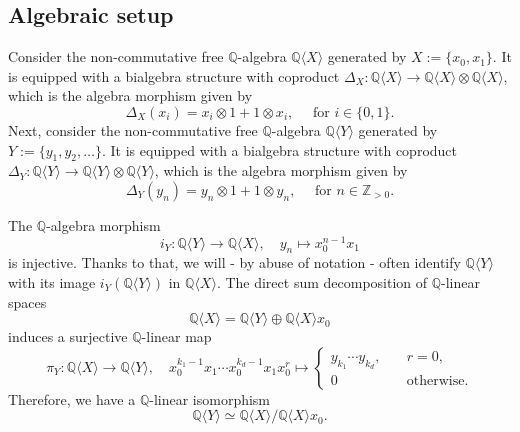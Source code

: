 \documentclass[11pt, a4paper]{amsart}
\numberwithin{equation}{section}
\theoremstyle{definition}
\newcommand{\Q}{\mathbb{Q}}
\newcommand{\QX}{\Q\langle X\rangle}
\newcommand{\QY}{\Q\langle Y\rangle}
\begin{document}
\subsection{Algebraic setup}
Consider the non-commutative free $\Q$-algebra $\QX$ generated by $X := \{x_0,x_1\}$. It is equipped with a bialgebra structure with coproduct $\Delta_X : \QX \to \QX \otimes \QX$, which is the algebra morphism given by
\begin{equation} \label{eq:shuffle_coprod_X}
\Delta_X(x_i) = x_i \otimes 1 + 1 \otimes x_i, \quad \text{ for } i \in \{0, 1\}.
\end{equation}
Next, consider the non-commutative free $\Q$-algebra $\QY$ generated by $Y := \{y_1, y_2, \ldots \}$. It is equipped with a bialgebra structure with coproduct $\Delta_Y : \QY \to \QY \otimes \QY$, which is the algebra morphism given by
\begin{equation} \label{eq:shuffle_coprod_Y}
\Delta_Y(y_n) = y_n \otimes 1 + 1 \otimes y_n, \quad \text{ for } n \in \mathbb{Z}_{> 0}.
\end{equation}

The $\Q$-algebra morphism 
\begin{equation*}
    i_Y : \QY \to \QX, \quad y_n \mapsto x_0^{n-1} x_1
\end{equation*}
is injective. Thanks to that, we will - by abuse of notation - often identify $\QY$ with its image $i_Y(\QY)$ in $\QX$.
The direct sum decomposition of $\Q$-linear spaces
\[
    \QX = \QY\oplus \QX x_0
\]
induces a surjective $\Q$-linear map
\begin{equation*}
    \pi_Y: \QX \to \QY, \quad x_0^{k_1-1}x_1\cdots x_0^{k_d-1}x_1x_0^{r} \mapsto
    \begin{cases}
        y_{k_1}\cdots y_{k_d}, &\quad r=0, \\
        0 & \quad \text{otherwise}.
    \end{cases}
\end{equation*}
Therefore, we have a $\Q$-linear isomorphism 
\begin{equation} \label{eq:QY_simeq_quotient}
    \QY \simeq \QX / \QX x_0.
\end{equation}
\end{document}
